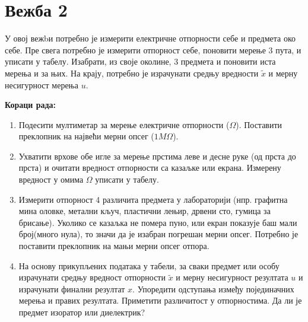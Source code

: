 \documentclass[10pt]{article}
\begin{document}
\newpage
\section{Вежба 2}

У овој вежbи потребно је измерити електричне отпорности себе и предмета око себе. 
Пре свега потребно је измерити отпорност себе, поновити мерење 3 пута, и уписати у табелу. 
Изабрати, из своје околине, 3 предмета и поновити иста мерења и за њих. На крају, потребно 
је израчунати средњу вредности $\tilde{x}$ и 
мерну несигурност мерења $u$.


\textbf{Кораци рада:}
\begin{enumerate}
  \item Подесити мултиметар за мерење електричне отпорности ($\Omega$). Поставити преклопник на 
  највећи мерни опсег ($1 M \Omega$).
  \item Ухватити врхове обе игле за мерење прстима леве и десне руке (од прста до прста) и 
  очитати вредност отпорности са казаљке или екрана. Измерену вредност у омима $\Omega$ уписати у табелу.
  \item Измерити отпорност 4 различита предмета у лабораторији 
  (нпр. графитна мина оловке, метални кључ, пластични лењир, дрвени сто, 
  гумица за брисање). Уколико се казаљка не помера пуно, или екран показује баш мали број(много нула),
  то значи да је изабран погрешан мерни опсег. Потребно је поставити преклопник на мањи мерни опсег отпора. 
  \item На основу прикупљених података у табели, за сваки предмет или особу израчунати средњу 
  вредност отпорности $\tilde{x}$ и мерну несигурност резултата $u$ и израчунати финални резултат $x$.
  Упоредити одступања између појединачних мерења и правих резултата. Приметити различитост у отпорностима. Да ли је предмет изоратор или диелектрик?
\end{enumerate}

\end{document}

